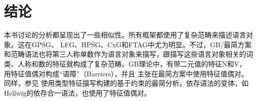 \chapter{结论}

\largerpage[2]
本书讨论的分析都呈现出了一些相似性。所有框架都使用了复杂范畴来描述语言对象。这在GPSG\indexgpsg、
LFG\indexlfg、HPSG\indexhpsg、CxG\indexcxg 和FTAG\indextag 中尤为明显。不过，GB/最简方案和范畴语法也将第三人称单数作为语言对象来描写，跟描写这些语言对象相关的词类、人称和数的特征就构成了复杂范畴。GB理论中，有带二元值的特征N和V\citep[]{Chomsky70a}， \citet[]{Stabler92a-u}用特征值偶对构成“语障”（Barriers），并且 \citet[--291]{SE2002a}主张在最简方案\indexmp 中使用特征值偶对。同样，参见 \citet{Veenstra98a}使用类型特征描写构建的基于约束的最简分析。依存语法的变体，如Hellwig的依存合一语法，也使用了特征值偶对\citep[]{Hellwig2003a}。

